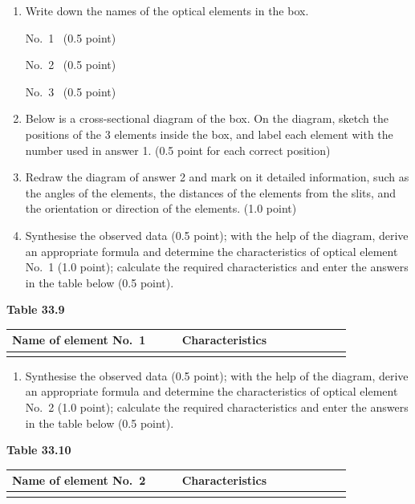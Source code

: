 \begin{enumerate}[label=(\arabic*),start=2]
\item Write down the names of the optical elements in the box.

\noindent No.~1 \dotfill\ (0.5 point)

\noindent No.~2 \dotfill\ (0.5 point)

\noindent No.~3 \dotfill\ (0.5 point)

\item Below is a cross-sectional diagram of the box. On the diagram, sketch the positions of the 3 elements inside the box, and label each element with the number used in answer 1. (0.5 point for each correct position)

\item Redraw the diagram of answer 2 and mark on it detailed information, such as the angles of the elements, the distances of the elements from the slits, and the orientation or direction of the elements. (1.0 point)

\item Synthesise the observed data (0.5 point); with the help of the diagram, derive an appropriate formula and determine the characteristics of optical element No.~1 (1.0 point); calculate the required characteristics and enter the answers in the table below (0.5 point).
\end{enumerate}

\begin{center}
\small\textbf{Table 33.9}
\end{center}
\begin{center}
\begin{tabular}{|p{0.42\linewidth}|p{0.42\linewidth}|}
\hline
\centering Name of element No.~1 & \centering\arraybackslash Characteristics \tabularnewline
\hline
\rule{0pt}{1.6cm} & \tabularnewline
\hline
\end{tabular}
\end{center}

\begin{enumerate}[label=(\arabic*),start=6]
\item Synthesise the observed data (0.5 point); with the help of the diagram, derive an appropriate formula and determine the characteristics of optical element No.~2 (1.0 point); calculate the required characteristics and enter the answers in the table below (0.5 point).
\end{enumerate}

\begin{center}
\small\textbf{Table 33.10}
\end{center}
\begin{center}
\begin{tabular}{|p{0.42\linewidth}|p{0.42\linewidth}|}
\hline
\centering Name of element No.~2 & \centering\arraybackslash Characteristics \tabularnewline
\hline
\rule{0pt}{1.6cm} & \tabularnewline
\hline
\end{tabular}
\end{center}

